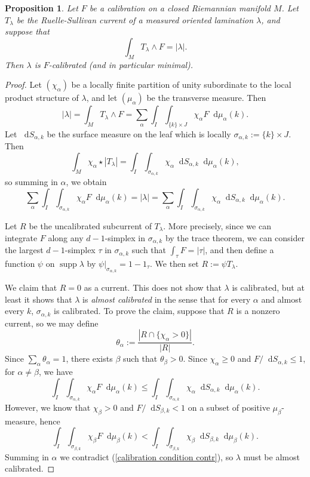 \documentclass[reqno,11pt]{amsart}
\newcommand*\dif{\mathop{}\!\mathrm{d}}
\DeclareMathOperator{\supp}{supp}
\newcommand{\dfn}[1]{\emph{#1}\index{#1}}
\newtheorem{proposition}[theorem]{Proposition}
\theoremstyle{definition}
\numberwithin{equation}{section}
\begin{document}
\begin{proposition}\label{calibration condition}
Let $F$ be a calibration on a closed Riemannian manifold $M$.
Let $T_\lambda$ be the Ruelle-Sullivan current of a measured oriented lamination $\lambda$, and suppose that 
\begin{equation}\label{calibration by Ruelle Sullivan}
\int_M T_\lambda \wedge F = |\lambda|.
\end{equation}
Then $\lambda$ is $F$-calibrated (and in particular minimal).
\end{proposition}
\begin{proof}
Let $(\chi_\alpha)$ be a locally finite partition of unity subordinate to the local product structure of $\lambda$, and let $(\mu_\alpha)$ be the transverse measure.
Then 
$$|\lambda| = \int_M T_\lambda \wedge F = \sum_\alpha \int_I \int_{\{k\} \times J} \chi_\alpha F \dif \mu_\alpha(k).$$
Let $\dif S_{\alpha,k}$ be the surface measure on the leaf which is locally $\sigma_{\alpha,k} := \{k\} \times J$. Then
$$\int_M \chi_\alpha \star |T_\lambda| = \int_I \int_{\sigma_{\alpha,k}} \chi_\alpha \dif S_{\alpha,k} \dif \mu_\alpha(k),$$
so summing in $\alpha$, we obtain 
\begin{equation}\label{calibration condition contr}
\sum_\alpha \int_I \int_{\sigma_{\alpha,k}} \chi_\alpha F \dif \mu_\alpha(k) = |\lambda| = \sum_\alpha \int_I \int_{\sigma_{\alpha,k}} \chi_\alpha \dif S_{\alpha,k} \dif \mu_\alpha(k).
\end{equation}

Let $R$ be the uncalibrated subcurrent of $T_\lambda$.
More precisely, since we can integrate $F$ along any $d-1$-simplex in $\sigma_{\alpha, k}$ by the trace theorem, we can consider the largest $d-1$-simplex $\tau$ in $\sigma_{\alpha, k}$ such that $\int_\tau F = |\tau|$, and then define a function $\psi$ on $\supp \lambda$ by $\psi|_{\sigma_{\alpha, k}} = 1 - 1_\tau$.
We then set $R := \psi T_\lambda$.

We claim that $R = 0$ as a current.
This does not show that $\lambda$ is calibrated, but at least it shows that $\lambda$ is \dfn{almost calibrated} in the sense that for every $\alpha$ and almost every $k$, $\sigma_{\alpha, k}$ is calibrated.
To prove the claim, suppose that $R$ is a nonzero current, so we may define 
$$\theta_\alpha := \frac{|R \cap \{\chi_\alpha > 0\}|}{|R|}.$$
Since $\sum_\alpha \theta_\alpha = 1$, there exists $\beta$ such that $\theta_\beta > 0$.
Since $\chi_\alpha \geq 0$ and $F/\dif S_{\alpha, k} \leq 1$, for $\alpha \neq \beta$, we have 
$$\int_I \int_{\sigma_{\alpha, k}} \chi_\alpha F \dif \mu_\alpha(k) \leq \int_I \int_{\sigma_{\alpha, k}} \chi_\alpha \dif S_{\alpha, k} \dif \mu_\alpha(k).$$
However, we know that $\chi_\beta > 0$ and $F/\dif S_{\beta, k} < 1$ on a subset of positive $\mu_\beta$-measure, hence 
$$\int_I \int_{\sigma_{\beta, k}} \chi_\beta F \dif \mu_\beta(k) < \int_I \int_{\sigma_{\beta, k}} \chi_\beta \dif S_{\beta, k} \dif \mu_\beta(k).$$
Summing in $\alpha$ we contradict (\ref{calibration condition contr}), so $\lambda$ must be almost calibrated.


\end{proof}
\end{document}

